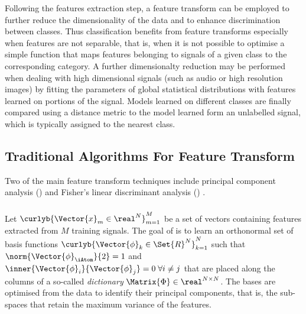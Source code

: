 \documentclass{article}
\def \fea{\Vector{x}} 	%
\def \iFea{n}	 		%
\def \nDim{N} 			%
\def \Dic{\Matrix{\Phi}} %
\def \iAto{k} 			%
\def \atom{\Vector{\phi}}%
\def \nFea{M}			%
\def \iFea{m}			%
\def \ambient{\Set{R}} 						%
\begin{document}
Following the features extraction step, a feature transform can be employed to further reduce the dimensionality of the data and to enhance discrimination between classes. Thus classification benefits from feature transforms especially when features are not separable, that is, when it is not possible to optimise a simple function that maps features belonging to signals of a given class to the corresponding category. 
A further dimensionalty reduction may be performed when dealing with high dimensional signals (such as audio or high resolution images) by fitting the parameters of global statistical distributions with features learned on portions of the signal. Models learned on different classes are finally compared using a distance metric to the model learned form an unlabelled signal, which is typically assigned to the nearest class.

\subsection{Traditional Algorithms For Feature Transform}\label{sec:aft}
Two of the main feature transform techniques include principal component analysis () \cite{Pearson1901On} and Fisher's linear discriminant analysis () \cite{Duda1973Pa}.

\subsubsection{}

Let $\curlyb{\fea_{\iFea} \in \real^{\nDim}}_{\iFea=1}^{\nFea}$ be a set of vectors containing features extracted from $\nFea$ training signals. The goal of  is to learn an orthonormal set of basis functions $\curlyb{\atom_{\iAto} \in \ambient^{\nDim}}_{\iAto=1}^{\nDim}$ such that $ \norm{\atom_{\iAtom}}{2}=1$ and $\inner{\atom_{i}}{\atom_{j}}=0 \; \forall i\neq j$ that are placed along the columns of a so-called \emph{dictionary} $\Dic\in\real^{\nDim\times\nDim}$. The bases are optimised from the data to identify their principal components, that is, the sub-spaces that retain the maximum variance of the features.
\end{document}
